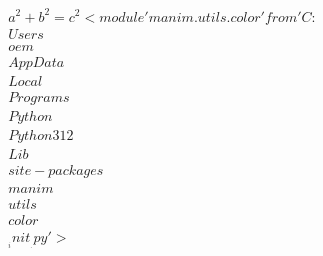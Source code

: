 \documentclass[preview]{standalone}
\begin{document}
\begin{align*}
a^2+b^2 = c^2 <module 'manim.utils.color' from 'C:\\Users\\oem\\AppData\\Local\\Programs\\Python\\Python312\\Lib\\site-packages\\manim\\utils\\color\\__init__.py'>
\end{align*}
\end{document}
